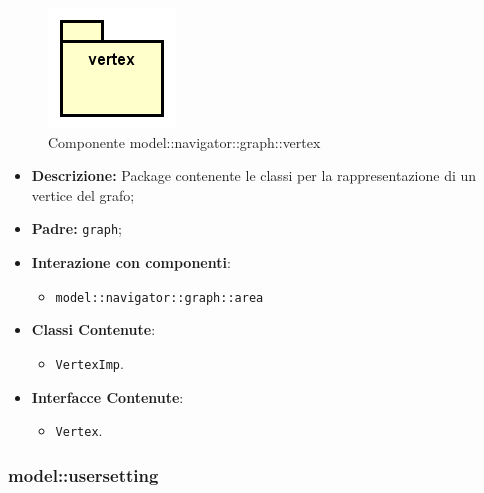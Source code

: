 \documentclass[../DefinizioneDiProdotto.tex]{subfiles}
\begin{document}
\begin{figure}[H]
	\centering
	\includegraphics[width=\maxwidth]{img/package/vertex.png}
	\caption{Componente model::\-navigator::\-graph::\-vertex}\label{fig:model::navigator::graph::vertex} 
\end{figure}
\begin{itemize}
	\item \textbf{Descrizione:} Package contenente le classi per la rappresentazione di un vertice del grafo;
	\item \textbf{Padre:} \texttt{graph};
	\item \textbf{Interazione con componenti}:
	\begin{itemize}
		\item \texttt{model::navigator::graph::area}
	\end{itemize}
	\item \textbf{Classi Contenute}:
	\begin{itemize}
		\item \texttt{VertexImp}.
		
	\end{itemize}
	\item \textbf{Interfacce Contenute}:
	\begin{itemize}
		\item \texttt{Vertex}.
		
	\end{itemize}
\end{itemize}

\subsubsection{model::\-usersetting}
\end{document}
